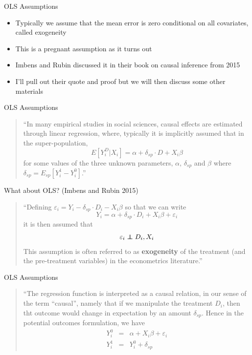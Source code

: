 \documentclass{beamer}
\newcommand\independent{\protect\mathpalette{\protect\independenT}{\perp}}
\def\independenT#1#2{\mathrel{\rlap{$#1#2$}\mkern2mu{#1#2}}}
\begin{document}
\begin{frame}{OLS Assumptions}

\begin{itemize}

\item Typically we assume that the mean error is zero conditional on all covariates, called exogeneity
\item This is a pregnant assumption as it turns out
\item Imbens and Rubin discussed it in their book on causal inference from 2015
\item I'll pull out their quote and proof but we will then discuss some other materials

\end{itemize}

\end{frame}


\begin{frame}{OLS Assumptions}

	\begin{quote} 
	``In many empirical studies in social sciences, causal effects are estimated through linear regression, where, typically it is implicitly assumed that in the super-population, $$E[Y_i^D | X_i] = \alpha + \delta_{sp} \cdot D + X_i \beta$$ for some values of the three unknown parameters, $\alpha$, $\delta_{sp}$ and $\beta$ where $\delta_{sp} = E_{sp} [ Y_i^1 - Y_i^0]$.''
	\end{quote}
	
\end{frame}

\begin{frame}{What about OLS?  (Imbens and Rubin 2015)}

\begin{quote}
``Defining $\varepsilon_i = Y_i - \delta_{sp} \cdot D_i - X_i \beta$ so that we can write $$Y_i = \alpha + \delta_{sp} \cdot D_i + X_i \beta  + \varepsilon_i$$ it is then assumed that $$\varepsilon_i \independent D_i, X_i$$This assumption is often referred to as \textbf{exogeneity} of the treatment (and the pre-treatment variables) in the econometrics literature.''

\end{quote}

\end{frame}

\begin{frame}{OLS Assumptions}

\begin{quote}
``The regression function is interpreted as a causal relation, in our sense of the term ``causal'', namely that if we manipulate the treatment $D_i$, then tht outcome would change in expectation by an amount $\delta_{sp}$.  Hence in the potential outcomes formulation, we have 
\begin{eqnarray*}
Y_i^0 &=& \alpha + X_i \beta + \varepsilon_i \\ 
Y_i^1 &=& Y_i^0 + \delta_{sp}
\end{eqnarray*} 

\end{quote}
	
\end{frame}
\end{document}
